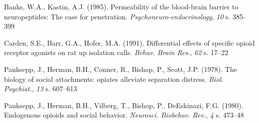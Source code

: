 \documentclass[12pt]{article}
\newcommand{\apaartykul}[6]{#1 (#2). #3. \textit{#4}, \textit{#5} s. #6}
\begin{document}
\apaartykul{Banks, W.A., Kastin, A.J.}{1985}{Permeability of the blood-brain barrier to neuropeptides: The case for penetration}{Psychoneuro-endocrinology}{10}{385–399}

\apaartykul{Carden, S.E., Barr, G.A., Hofer, M.A.}{1991}{Differential effects of specific opioid receptor agonists on rat up isolation calls}{Behav. Brain Res.}{62}{17–22}

\apaartykul{Panksepp, J., Herman, B.H., Conner, R., Bishop, P., Scott, J.P.}{1978}{The biology of social attachments: opiates alleviate separation distress}{Biol. Psychiat.}{13}{607–613}

\apaartykul{Panksepp, J., Herman, B.H., Vilberg, T., Bishop, P., DeEskinazi, F.G.}{1980}{Endogenous opioids and social behavior}{Neurosci. Biobehav. Rev.}{4}{473–48}
\end{document}
